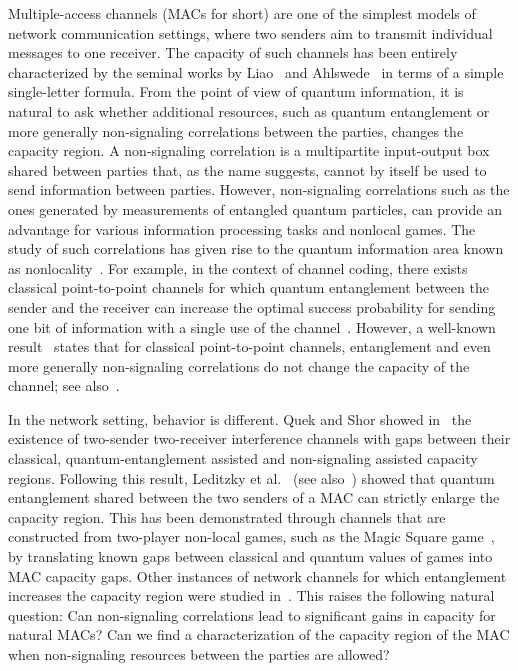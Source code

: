 Multiple-access channels (MACs for short) are one of the simplest models of network communication settings, where two senders aim to transmit individual messages to one receiver. The capacity of such channels has been entirely characterized by the seminal works by Liao~\cite{Liao73} and Ahlswede~\cite{Ahlswede73} in terms of a simple single-letter formula. From the point of view of quantum information, it is natural to ask whether additional resources, such as quantum entanglement or more generally non-signaling correlations between the parties, changes the capacity region. A non-signaling correlation is a multipartite input-output box shared between parties that, as the name suggests, cannot by itself be used to send information between parties. However, non-signaling correlations such as the ones generated by measurements of entangled quantum particles, can provide an advantage for various information processing tasks and nonlocal games. The study of such correlations has given rise to the quantum information area known as nonlocality~\cite{BCPSW14}. For example, in the context of channel coding, there exists classical point-to-point channels for which quantum entanglement between the sender and the receiver can increase the optimal success probability for sending one bit of information with a single use of the channel~\cite{PLMK11,BF18}. However, a well-known result~\cite{BSST99} states that for classical point-to-point channels, entanglement and even more generally non-signaling correlations do not change the capacity of the channel; see also~\cite{Matthews12,BF18}.

In the network setting, behavior is different. Quek and Shor showed in~\cite{QS17} the existence of two-sender two-receiver interference channels with gaps between their classical, quantum-entanglement assisted and non-signaling assisted capacity regions. Following this result, Leditzky et al.~\cite{LALS20} (see also~\cite{SLSS22}) showed that quantum entanglement shared between the two senders of a MAC can strictly enlarge the capacity region. This has been demonstrated through channels that are constructed from two-player non-local games, such as the Magic Square game~\cite{Mermin90,Peres90,Aravind02,BBT05}, by translating known gaps between classical and quantum values of games into MAC capacity gaps. Other instances of network channels for which entanglement increases the capacity region were studied in~\cite{Noetzel20,ND20}. This raises the following natural question: Can non-signaling correlations lead to significant gains in capacity for natural MACs? Can we find a characterization of the capacity region of the MAC when non-signaling resources between the parties are allowed? 


